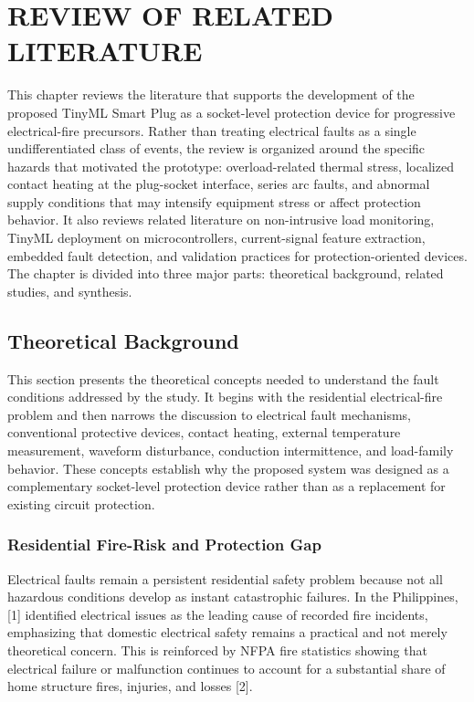 \chapter{REVIEW OF RELATED LITERATURE}\label{chap:review-of-related-literature}

This chapter reviews the literature that supports the development of the
proposed TinyML Smart Plug as a socket-level protection device for
progressive electrical-fire precursors. Rather than treating electrical
faults as a single undifferentiated class of events, the review is
organized around the specific hazards that motivated the prototype:
overload-related thermal stress, localized contact heating at the
plug-socket interface, series arc faults, and abnormal supply conditions
that may intensify equipment stress or affect protection behavior. It
also reviews related literature on non-intrusive load monitoring, TinyML
deployment on microcontrollers, current-signal feature extraction,
embedded fault detection, and validation practices for
protection-oriented devices. The chapter is divided into three major
parts: theoretical background, related studies, and synthesis.

\section{Theoretical Background}\label{theoretical-background}

This section presents the theoretical concepts needed to understand the
fault conditions addressed by the study. It begins with the residential
electrical-fire problem and then narrows the discussion to electrical
fault mechanisms, conventional protective devices, contact heating,
external temperature measurement, waveform disturbance, conduction
intermittence, and load-family behavior. These concepts establish why
the proposed system was designed as a complementary socket-level
protection device rather than as a replacement for existing circuit
protection.

\subsection{Residential Fire-Risk and Protection Gap}\label{residential-fire-risk-and-protection-gap}

Electrical faults remain a persistent residential safety problem because
not all hazardous conditions develop as instant catastrophic failures.
In the Philippines, {[}1{]} identified electrical issues as the leading
cause of recorded fire incidents, emphasizing that domestic electrical
safety remains a practical and not merely theoretical concern. This is
reinforced by NFPA fire statistics showing that electrical failure or
malfunction continues to account for a substantial share of home
structure fires, injuries, and losses {[}2{]}.

